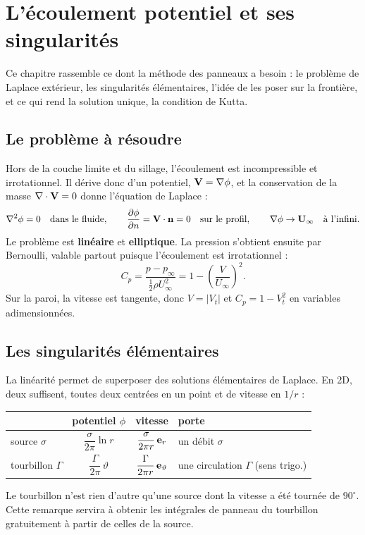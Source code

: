 \chapter{L'écoulement potentiel et ses singularités}\label{ch:potentiel}

Ce chapitre rassemble ce dont la méthode des panneaux a besoin : le problème de Laplace extérieur, les singularités élémentaires, l'idée de les poser sur la frontière, et ce qui rend la solution unique, la condition de Kutta.

\section{Le problème à résoudre}
Hors de la couche limite et du sillage, l'écoulement est incompressible et irrotationnel. Il dérive donc d'un potentiel, $\mathbf{V}=\nabla\phi$, et la conservation de la masse $\nabla\cdot\mathbf{V}=0$ donne l'équation de Laplace :
\[
\nabla^2\phi=0\quad\text{dans le fluide},\qquad
\frac{\partial\phi}{\partial n}=\mathbf{V}\cdot\mathbf{n}=0\quad\text{sur le profil},\qquad
\nabla\phi\to\mathbf{U}_\infty\quad\text{à l'infini}.
\]
Le problème est \textbf{linéaire} et \textbf{elliptique}. La pression s'obtient ensuite par Bernoulli, valable partout puisque l'écoulement est irrotationnel :
\[
C_p=\frac{p-p_\infty}{\tfrac12\rho U_\infty^2}=1-\left(\frac{V}{U_\infty}\right)^2 .
\]
Sur la paroi, la vitesse est tangente, donc $V=|V_t|$ et $C_p=1-V_t^2$ en variables adimensionnées.

\section{Les singularités élémentaires}
La linéarité permet de superposer des solutions élémentaires de Laplace. En 2D, deux suffisent, toutes deux centrées en un point et de vitesse en $1/r$ :
\begin{center}
\renewcommand{\arraystretch}{1.4}
\begin{tabular}{lccl}
\toprule
 & potentiel $\phi$ & vitesse & porte\\
\midrule
source $\sigma$ & $\dfrac{\sigma}{2\pi}\ln r$ & $\dfrac{\sigma}{2\pi r}\,\mathbf{e}_r$ & un débit $\sigma$\\
tourbillon $\Gamma$ & $\dfrac{\Gamma}{2\pi}\,\vartheta$ & $\dfrac{\Gamma}{2\pi r}\,\mathbf{e}_\vartheta$ & une circulation $\Gamma$ (sens trigo.)\\
\bottomrule
\end{tabular}
\end{center}
Le tourbillon n'est rien d'autre qu'une source dont la vitesse a été tournée de $90^\circ$. Cette remarque servira à obtenir les intégrales de panneau du tourbillon gratuitement à partir de celles de la source.

